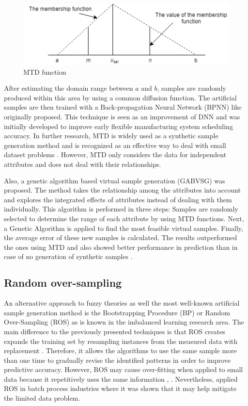 \documentclass[parskip=full]{scrartcl}
\begin{document}
\begin{figure}[H]
	\centering
	\includegraphics[width=0.6\linewidth]{../analysis/mtd_function.png}
	\caption{MTD function \cite{Li.2007}}
	\label{fig:mtd-function}
\end{figure}

After estimating the domain range between $\mathit{a}$ and $\mathit{b}$, samples
are randomly produced within this area by using a common diffusion function. The
artificial samples are then trained with a Back-propagation Neural Network
(BPNN) like \cite{Huang.2004} originally proposed. This technique is seen as an
improvement of DNN and was initially developed to improve early flexible
manufacturing system scheduling accuracy. In further research, MTD is widely
used as a synthetic sample generation method and is recognized as an effective
way to deal with small dataset problems \cite{AbdulLateh.2017}. However, MTD
only considers the data for independent attributes and does not deal with their
relationships. 

Also, a genetic algorithm based virtual sample generation (GABVSG) was proposed.
The method takes the relationship among the attributes into account and explores
the integrated effects of attributes instead of dealing with them individually.
This algorithm is performed in three steps: Samples are randomly selected to
determine the range of each attribute by using MTD functions. Next, a Genetic
Algorithm is applied to find the most feasible virtual samples. Finally, the
average error of these new samples is calculated. The results outperformed the
ones using MTD and also showed better performance in prediction than in case of
no generation of synthetic samples \cite{Li.2014}.

\subsection{Random over-sampling}

An alternative approach to fuzzy theories as well the most well-known artificial
sample generation method is the Bootstrapping Procedure (BP)
\cite{AbdulLateh.2017} or Random Over-Sampling (ROS) as is known in the
imbalanced learning research area. The main difference to the previously
presented techniques is that ROS creates expands the training set by resampling
instances from the measured data with replacement \cite{Efron.1993}. Therefore,
it allows the algorithms to use the same sample more than one time to gradually
revise the identified patterns in order to improve predictive accuracy. However,
ROS may cause over-fitting when applied to small data because it repetitively
uses the same information \cite{Tsai.2015}, \cite{Li.2018}. Nevertheless,
\cite{Ivanescu.2006} applied ROS in batch process industries where it was shown
that it may help mitigate the limited data problem.
\end{document}
